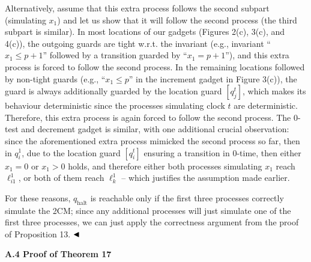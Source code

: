  
 
Alternatively, assume that this extra process follows the second subpart (simulating $x_{1}$) and let us show that it will follow the second process (the third subpart is similar). In most locations of our gadgets (Figures 2(c), 3(c), and 4(c)), the outgoing guards are tight w.r.t. the invariant (e.g., invariant “$x_{1}\leq p+1$” followed by a transition guarded by “$x_{1}=p+1$”), and this extra process is forced to follow the second process. In the remaining locations followed by non-tight guards (e.g., “$x_{1}\leq p$” in the increment gadget in Figure 3(c)), the guard is always additionally guarded by the location guard $[q_{j}^{t}]$, which makes its behaviour deterministic since the processes simulating clock $t$ are deterministic. Therefore, this extra process is again forced to follow the second process. The 0-test and decrement gadget is similar, with one additional crucial observation: since the aforementioned extra process mimicked the second process so far, then in $q_{i}^{1}$, due to the location guard $[q_{i}^{t}]$ ensuring a transition in 0-time, then either $x_{1}=0$ or $x_{1}>0$ holds, and therefore either both processes simulating $x_{1}$ reach $\mathrm{\mathrm{\ell}}_{i1}^{1}$, or both of them reach $\mathrm{\mathrm{\ell}}_{k}^{1}$ -- which justifies the assumption made earlier.\par
 
 
 
For these reasons, $q_{\textrm{halt}}$ is reachable only if the first three processes correctly simulate the 2CM; since any additional processes will just simulate one of the first three processes, we can just apply the correctness argument from the proof of Proposition 13. $\hfill\blacktriangleleft$\par
 
 
 
 
 
\par\medskip\noindent\textbf{A.4 Proof of Theorem 17}\par
 
 
 
